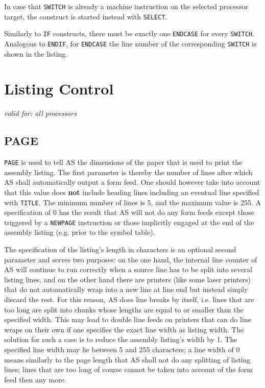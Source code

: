 \documentclass[12pt,twoside]{report}
\makeatletter
\newcommand{\bb}[1]{{\bf #1}}
\newcommand{\tty}[1]{{\tt #1}}
\newcommand{\ttindex}[1]{\index{#1@{\tt #1}}}
\makeatother
\begin{document}
In case that \tty{SWITCH} is already a machine instruction on the
selected processor target, the construct is started instead with
\tty{SELECT}.

Similarly to {\tt IF} constructs, there must be exactly one {\tt ENDCASE}
for every {\tt SWITCH}.  Analogous to {\tt ENDIF}, for {\tt ENDCASE} the
line number of the corresponding {\tt SWITCH} is shown in the listing.


\section{Listing Control}

{\em valid for: all processors}


\subsection{PAGE}
\ttindex{PAGE}

\tty{PAGE} is used to tell AS the dimensions of the paper that is used to
print the assembly listing.  The first parameter is thereby the
number of lines after which AS shall automatically output a form
feed.  One should however take into account that this value does \bb{not}
include heading lines including an eventual line specified with
\tty{TITLE}.  The minimum number of lines is 5, and the maximum value is
255.  A specification of 0 has the result that AS will not do any form
feeds except those triggered by a \tty{NEWPAGE} instruction or those
implicitly engaged at the end of the assembly listing (e.g. prior to the
symbol table).

The specification of the listing's length in characters is an
optional second parameter and serves two purposes: on the one hand,
the internal line counter of AS will continue to run correctly when a
source line has to be split into several listing lines, and on
the other hand there are printers (like some laser printers) that do
not automatically wrap into a new line at line end but instead simply
discard the rest.  For this reason, AS does line breaks by itself,
i.e. lines that are too long are split into chunks whose lengths are
equal to or smaller than the specified width.  This may lead to
double line feeds on printers that can do line wraps on their own if
one specifies the exact line width as listing width.  The solution
for such a case is to reduce the assembly listing's width by 1.  The
specified line width may lie between 5 and 255 characters; a line
width of 0 means similarly to the page length that AS shall not do
any splitting of listing lines; lines that are too long of course
cannot be taken into account of the form feed then any more.
\end{document}
